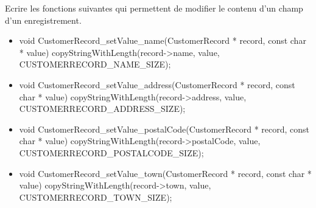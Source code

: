 Ecrire les fonctions suivantes qui permettent de modifier le contenu d'un champ d'un enregistrement.
\begin{itemize}
  \item {}
\begin{csourcecorrection}
void CustomerRecord_setValue_name(CustomerRecord * record, const char * value) {
    copyStringWithLength(record->name, value, CUSTOMERRECORD_NAME_SIZE);
}
\end{csourcecorrection}
	\item {}
\begin{csourcecorrection}
void CustomerRecord_setValue_address(CustomerRecord * record, const char * value) {
    copyStringWithLength(record->address, value, CUSTOMERRECORD_ADDRESS_SIZE);
}
\end{csourcecorrection}
\item {}
\begin{csourcecorrection}
void CustomerRecord_setValue_postalCode(CustomerRecord * record, const char * value) {
    copyStringWithLength(record->postalCode, value, CUSTOMERRECORD_POSTALCODE_SIZE);
}
\end{csourcecorrection}
\item {}
\begin{csourcecorrection}
void CustomerRecord_setValue_town(CustomerRecord * record, const char * value) {
    copyStringWithLength(record->town, value, CUSTOMERRECORD_TOWN_SIZE);
}
\end{csourcecorrection}
\end{itemize}

